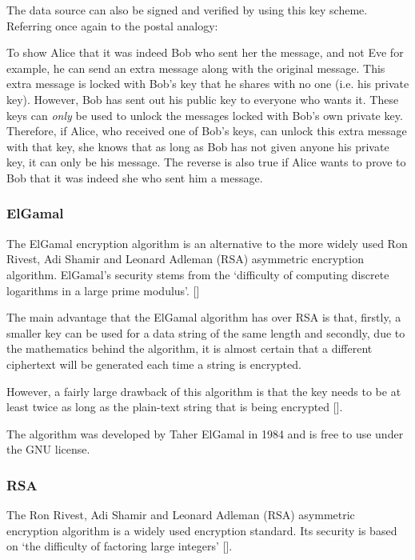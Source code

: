 The data source can also be signed and verified by using this key scheme. Referring once again
to the postal analogy:

To show Alice that it was indeed Bob who sent her the message, and not Eve for example, he can
send an extra message along with the original message. This extra message is locked with Bob's
key that he shares with no one (i.e. his private key). However, Bob has sent out his
public key to everyone who wants it. These keys can \emph{only} be used to unlock
the messages locked with Bob's own private key. Therefore, if Alice, who received one of Bob's keys, can unlock this extra
message with that key, she knows that as long as Bob has not given anyone his
private key, it can only be his message. The reverse is also true if Alice
wants to prove to Bob that it was indeed she who sent him a message. 

\subsubsection{ElGamal}
\label{sec:elgamal}

The ElGamal encryption algorithm is an alternative to the more widely used  Ron Rivest, Adi
Shamir and Leonard Adleman (RSA) asymmetric encryption algorithm. ElGamal's security stems
from the `difficulty of computing discrete logarithms in a large prime modulus'.
[\cite{website:elgamal}]

The main advantage that the ElGamal algorithm has over RSA is that, firstly, a smaller key can
be used for a data string of the same length and secondly, due to the mathematics behind the
algorithm, it is almost certain that a different ciphertext will be generated each time a
string is encrypted.

However, a fairly large drawback of this algorithm is that the key needs to be at least twice
as long as the plain-text string that is being encrypted
[\cite{journal:elgamal}].

The algorithm was developed by Taher ElGamal in 1984 and is free to use under the GNU license.

\subsubsection{RSA}
\label{sec:rsa}

The Ron Rivest, Adi Shamir and Leonard Adleman (RSA) asymmetric encryption algorithm is a
widely used encryption standard. Its security is based on `the difficulty of factoring large 
integers' [\cite{website:elgamal}]. 

